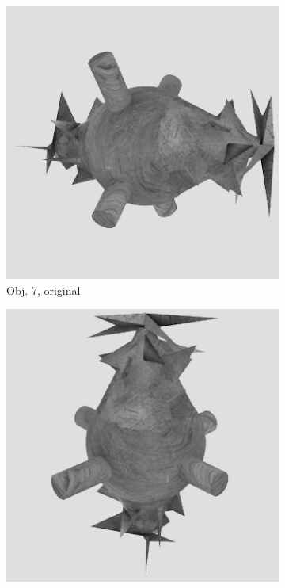 \begin{figure}
\medskip
\begin{subfigure}{0.2\textwidth}
\includegraphics[width=\linewidth]{Bilder/Objekt7A.png}
\caption{Obj. 7, original} \label{fig:c}
\end{subfigure}\hspace{.5cm} %
\begin{subfigure}{0.2\textwidth}
\includegraphics[width=\linewidth]{Bilder/Objekt7B.png}

\end{subfigure}
\end{figure}
